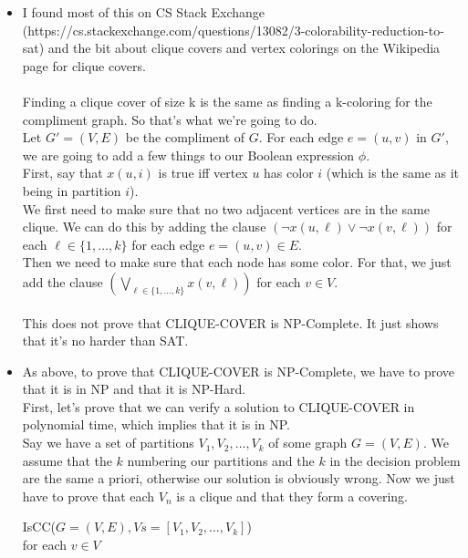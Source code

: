\documentclass[11pt]{article}
\begin{document}
\begin{solution}
    \begin{itemize}
        \item I found most of this on CS Stack Exchange (https://cs.stackexchange.com/questions/13082/3-colorability-reduction-to-sat) and the bit about clique covers and vertex colorings on the Wikipedia page for clique covers.
            \\ \\ Finding a clique cover of size k is the same as finding a k-coloring for the compliment graph. So that's what we're going to do.
            \\ Let $G' = (V, E)$ be the compliment of $G$. For each edge $e = (u, v)$ in $G'$, we are going to add a few things to our Boolean expression $\phi$.
            \\ First, say that $x(u, i)$ is true iff vertex $u$ has color $i$ (which is the same as it being in partition $i$).
            \\ We first need to make sure that no two adjacent vertices are in the same clique. We can do this by adding the clause $(\neg x(u, \ell) \lor \neg x(v, \ell))$ for each $\ell \in \{1, \ldots, k\}$ for each edge $e = (u, v) \in E$.
            \\ Then we need to make sure that each node has some color. For that, we just add the clause $\left(\bigvee_{\ell \in \{1, \ldots, k\}} x(v, \ell)\right)$ for each $v \in V$.
            \\ \\ This does not prove that CLIQUE-COVER is NP-Complete. It just shows that it's no harder than SAT. 
        \item As above, to prove that CLIQUE-COVER is NP-Complete, we have to prove that it is in NP and that it is NP-Hard. 
            \\ First, let's prove that we can verify a solution to CLIQUE-COVER in polynomial time, which implies that it is in NP.
            \\ Say we have a set of partitions $V_1, V_2, \ldots, V_k$ of some graph $G = (V, E)$. We assume that the $k$ numbering our partitions and the $k$ in the decision problem are the same a priori, otherwise our solution is obviously wrong. Now we just have to prove that each $V_n$ is a clique and that they form a covering.
            \begin{algo}
                IsCC($G = (V, E), Vs = [V_1, V_2,\ldots, V_k]$) \+
                \\ for each $v \in V$ \+

\end{algo}
\end{itemize}
\end{solution}
\end{document}
